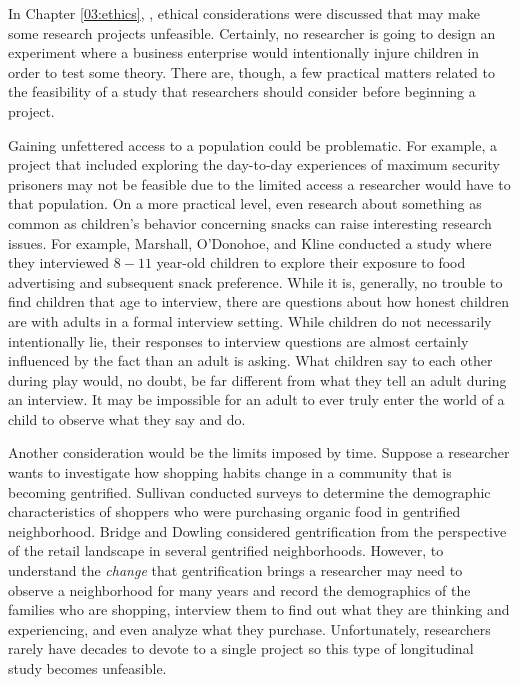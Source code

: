 In Chapter \ref{03:ethics}, , ethical considerations were discussed that may make some research projects unfeasible. Certainly, no researcher is going to design an experiment where a business enterprise would intentionally injure children in order to test some theory. There are, though, a few practical matters related to the feasibility of a study that researchers should consider before beginning a project. 

Gaining unfettered access to a population could be problematic. For example, a project that included exploring the day-to-day experiences of maximum security prisoners may not be feasible due to the limited access a researcher would have to that population. On a more practical level, even research about something as common as children's behavior concerning snacks can raise interesting research issues. For example, Marshall, O'Donohoe, and Kline\cite{marshall2007families} conducted a study where they interviewed $ 8-11 $ year-old children to explore their exposure to food advertising and subsequent snack preference. While it is, generally, no trouble to find children that age to interview, there are questions about how honest children are with adults in a formal interview setting. While children do not necessarily intentionally lie, their responses to interview questions are almost certainly influenced by the fact than an adult is asking. What children say to each other during play would, no doubt, be far different from what they tell an adult during an interview. It may be impossible for an adult to ever truly enter the world of a child to observe what they say and do. 

Another consideration would be the limits imposed by time. Suppose a researcher wants to investigate how shopping habits change in a community that is becoming gentrified. Sullivan\cite{sullivan2014food} conducted surveys to determine the demographic characteristics of shoppers who were purchasing organic food in gentrified neighborhood. Bridge and Dowling\cite{bridge2001microgeographies} considered gentrification from the perspective of the retail landscape in several gentrified neighborhoods. However, to understand the \textit{change} that gentrification brings a researcher may need to observe a neighborhood for many years and record the demographics of the families who are shopping, interview them to find out what they are thinking and experiencing, and even analyze what they purchase. Unfortunately, researchers rarely have decades to devote to a single project so this type of longitudinal study becomes unfeasible.

